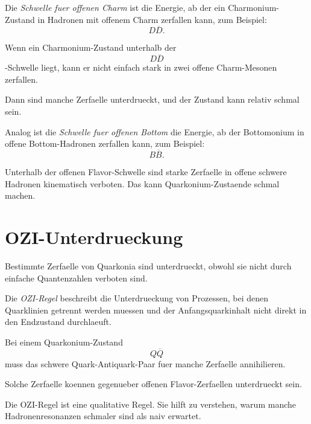 \begin{definitionbox}
Die \emph{Schwelle fuer offenen Charm} ist die Energie, ab der ein Charmonium-Zustand
in Hadronen mit offenem Charm zerfallen kann, zum Beispiel:
\[
    D\overline{D}.
\]
\end{definitionbox}

\begin{conceptbox}
Wenn ein Charmonium-Zustand unterhalb der
\[
    D\overline{D}
\]
-Schwelle liegt, kann er nicht einfach stark in zwei offene Charm-Mesonen zerfallen.

Dann sind manche Zerfaelle unterdrueckt, und der Zustand kann relativ schmal sein.
\end{conceptbox}

\begin{definitionbox}
Analog ist die \emph{Schwelle fuer offenen Bottom} die Energie, ab der Bottomonium
in offene Bottom-Hadronen zerfallen kann, zum Beispiel:
\[
    B\overline{B}.
\]
\end{definitionbox}

\begin{examtipbox}
Unterhalb der offenen Flavor-Schwelle sind starke Zerfaelle in offene schwere
Hadronen kinematisch verboten.
Das kann Quarkonium-Zustaende schmal machen.
\end{examtipbox}

\section{OZI-Unterdrueckung}

Bestimmte Zerfaelle von Quarkonia sind unterdrueckt, obwohl sie nicht durch einfache
Quantenzahlen verboten sind.

\begin{definitionbox}
Die \emph{OZI-Regel} beschreibt die Unterdrueckung von Prozessen, bei denen
Quarklinien getrennt werden muessen und der Anfangsquarkinhalt nicht direkt in den
Endzustand durchlaeuft.
\end{definitionbox}

\begin{conceptbox}
Bei einem Quarkonium-Zustand
\[
    Q\overline{Q}
\]
muss das schwere Quark-Antiquark-Paar fuer manche Zerfaelle annihilieren.

Solche Zerfaelle koennen gegenueber offenen Flavor-Zerfaellen unterdrueckt sein.
\end{conceptbox}

\begin{notebox}
Die OZI-Regel ist eine qualitative Regel.
Sie hilft zu verstehen, warum manche Hadronenresonanzen schmaler sind als naiv
erwartet.
\end{notebox}

